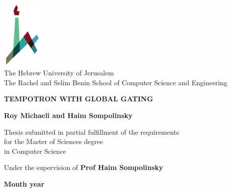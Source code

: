 \begin{titlepage}
    \begin{center}
        \vspace*{1cm}
        
        \includegraphics[width=0.15\textwidth]{images/huji_logo_notext.pdf}\\
        The Hebrew University of Jerusalem\\
        The Rachel and Selim Benin School of Computer Science and Engineering
        
        \vspace{2cm}
        
        {\Large \textbf{TEMPOTRON WITH GLOBAL GATING }}
        
        
        \textbf{Roy Michaeli and Haim Sompolinsky}
        
        \vspace{1cm}
        
        Thesis submitted in partial fulfillment of the requirements\\for the Master of Sciences degree\\
        in Computer Science
        
        \vspace{1cm}
        
        Under the supervision of \textbf{Prof Haim Sompolinsky}
        
        \vfill
        
        \textbf{Month year}
    \end{center}
\end{titlepage}
